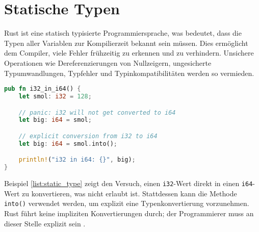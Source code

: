 
\chapter{Statische Typen}

Rust ist eine statisch typisierte Programmiersprache, was bedeutet, dass die Typen aller Variablen zur Kompilierzeit bekannt sein müssen. 
Dies ermöglicht dem Compiler, viele Fehler frühzeitig zu erkennen und zu verhindern. 
Unsichere Operationen wie Dereferenzierungen von Nullzeigern, ungesicherte Typumwandlungen, Typfehler und Typinkompatibilitäten werden so vermieden.
\begin{lstlisting}[language=Rust, caption={i32 in i64}, label=list:static_type]
pub fn i32_in_i64() {
    let smol: i32 = 128;

    // panic: i32 will not get converted to i64
    let big: i64 = smol;

    // explicit conversion from i32 to i64 
    let big: i64 = smol.into();

    println!("i32 in i64: {}", big);
}
\end{lstlisting}

\noindent
Beispiel \ref{list:static_type} zeigt den Versuch, einen \texttt{i32}-Wert direkt in einen \texttt{i64}-Wert zu konvertieren, was nicht erlaubt ist. 
Stattdessen kann die Methode \texttt{into()} verwendet werden, um explizit eine Typenkonvertierung vorzunehmen. 
Rust führt keine impliziten Konvertierungen durch; der Programmierer muss an dieser Stelle explizit sein \cite[Kapitel 1, Types]{drysdale2024}.

